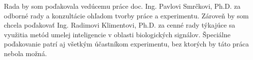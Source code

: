 \documentclass[slovak,master,unicode,oneside,bw]{ctufit-thesis}
\theoremstyle{plain}
\theoremstyle{definition}
\theoremstyle{remark}
\numberwithin{theorem}{chapter}
\begin{document}
 
\frontmatter\frontmatterinit %


\thispagestyle{empty}\cleardoublepage\maketitle %

\imprintpage %

\tableofcontents %
\listoffigures %
\begingroup
\let\clearpage\relax
\listoftables %
\endgroup

\begin{acknowledgmentpage}
	Rada by som poďakovala vedúcemu práce doc. Ing. Pavlovi Smrčkovi, Ph.D. za odborné rady a konzultácie ohľadom tvorby práce a experimentu. Zároveň by som chcela poďakovať Ing. Radimovi Klimentovi, Ph.D. za cenné rady týkajúce sa využitia metód umelej inteligencie v oblasti biologických signálov. Špeciálne poďakovanie patrí aj všetkým účastníkom experimentu, bez ktorých by táto práca nebola možná.
\end{acknowledgmentpage} 
\end{document}
